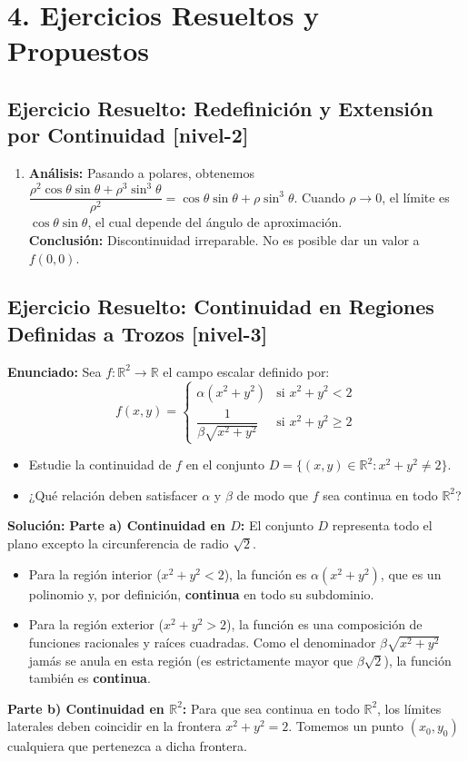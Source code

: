 \documentclass[11pt]{article}
\newenvironment{ejercicios}{%
  \section*{4. Ejercicios Resueltos y Propuestos}%
}{}
\newenvironment{ejercicioresuelto}[2]{\subsection*{Ejercicio Resuelto: #1 \small{[#2]}}}{}
\newcommand{\enunciado}[1]{\textbf{Enunciado:} #1\par\vspace{0.2cm}}
\newcommand{\solucion}[1]{\textbf{Solución:} #1\par\vspace{0.4cm}}
\begin{document}
\begin{ejercicios}
\begin{ejercicioresuelto}{Redefinición y Extensión por Continuidad}{nivel-2}
{\begin{enumerate}
        \item \textbf{Análisis:} Pasando a polares, obtenemos $\dfrac{\rho^2\cos\theta\sin\theta + \rho^3\sin^3\theta}{\rho^2} = \cos\theta\sin\theta + \rho\sin^3\theta$. Cuando $\rho \to 0$, el límite es $\cos\theta\sin\theta$, el cual depende del ángulo de aproximación.\\
        \textbf{Conclusión:} Discontinuidad irreparable. No es posible dar un valor a $f(0,0)$.
      \end{enumerate}
    }
  \end{ejercicioresuelto}

  \begin{ejercicioresuelto}{Continuidad en Regiones Definidas a Trozos}{nivel-3}
    \enunciado{
      Sea $f \colon \mathbb{R}^2 \to \mathbb{R}$ el campo escalar definido por:
      $$ f(x,y) = \begin{cases} \alpha(x^2+y^2) & \text{si } x^2+y^2 < 2 \\[0.5em] \dfrac{1}{\beta\sqrt{x^2+y^2}} & \text{si } x^2+y^2 \ge 2 \end{cases} $$
      \begin{itemize}
        \item[a)] Estudie la continuidad de $f$ en el conjunto $D = \{ (x,y) \in \mathbb{R}^2 \colon x^2+y^2 \neq 2 \}$.
        \item[b)] ¿Qué relación deben satisfacer $\alpha$ y $\beta$ de modo que $f$ sea continua en todo $\mathbb{R}^2$?
      \end{itemize}
    }
    \solucion{
      \textbf{Parte a) Continuidad en $D$:} 
      El conjunto $D$ representa todo el plano excepto la circunferencia de radio $\sqrt{2}$. 
      \begin{itemize}
        \item Para la región interior ($x^2+y^2 < 2$), la función es $\alpha(x^2+y^2)$, que es un polinomio y, por definición, \textbf{continua} en todo su subdominio.
        \item Para la región exterior ($x^2+y^2 > 2$), la función es una composición de funciones racionales y raíces cuadradas. Como el denominador $\beta\sqrt{x^2+y^2}$ jamás se anula en esta región (es estrictamente mayor que $\beta\sqrt{2}$), la función también es \textbf{continua}.
      \end{itemize}
      
      \textbf{Parte b) Continuidad en $\mathbb{R}^2$:}
      Para que sea continua en todo $\mathbb{R}^2$, los límites laterales deben coincidir en la frontera $x^2+y^2 = 2$. Tomemos un punto $(x_0, y_0)$ cualquiera que pertenezca a dicha frontera.
      
}
\end{ejercicioresuelto}
\end{ejercicios}
\end{document}
